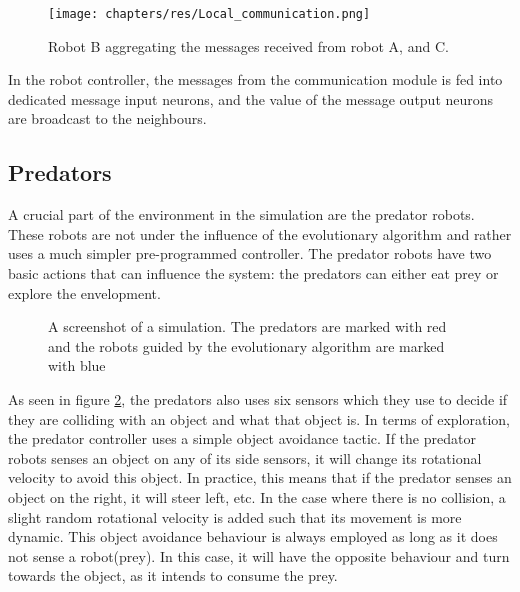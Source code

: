 \begin{figure}[H]
	\centering
	\texttt{[image: chapters/res/Local\_communication.png]}
	\caption{Robot B aggregating the messages received from robot A, and C.}
	\label{fig:local_communication}
\end{figure}
	
In the robot controller, the messages from the communication module is fed into dedicated message input neurons, and the value of the message output neurons are broadcast to the neighbours.

		
\subsection{Predators}
A crucial part of the environment in the simulation are the predator robots.
These robots are not under the influence of the evolutionary algorithm and rather uses a much simpler pre-programmed controller.
The predator robots have two basic actions that can influence the system: the predators can either eat prey or explore the envelopment.

\begin{figure}[H]
	\centering
	\caption{A screenshot of a simulation. The predators are marked with red and the robots guided by the evolutionary algorithm are marked with blue}
	\label{fig:predator_screendump}
\end{figure}

As seen in figure \ref{fig:predator_screendump}, the predators also uses six sensors which they use to decide if they are colliding with an object and what that object is.	
In terms of exploration, the predator controller uses a simple object avoidance tactic.
If the predator robots senses an object on any of its side sensors, it will change its rotational velocity to avoid this object.
In practice, this means that if the predator senses an object on the right, it will steer left, etc.
In the case where there is no collision, a slight random rotational velocity is added such that its movement is more dynamic.
This object avoidance behaviour is always employed as long as it does not sense a robot(prey).
In this case, it will have the opposite behaviour and turn towards the object, as it intends to consume the prey.

